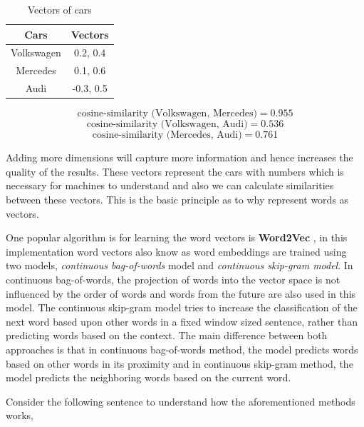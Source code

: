 \begin{table}[!ht]
\centering
\begin{tabular}{cc}
\hline
\textbf{Cars} & \textbf{Vectors} \\ \hline
Volkswagen    & 0.2, 0.4         \\ \hline
Mercedes      & 0.1, 0.6         \\ \hline
Audi          & -0.3, 0.5        \\ \hline
\end{tabular}
\caption{Vectors of cars}
\captionsetup{justification=centering,margin=2cm}
\label{my-label}
\end{table}

\begin{equation}
        \text{cosine-similarity (Volkswagen, Mercedes)} = 0.955 
\end{equation}
\begin{equation}
    \text{cosine-similarity (Volkswagen, Audi)} = 0.536
\end{equation}
\begin{equation}
    \text{cosine-similarity (Mercedes, Audi)} = 0.761
\end{equation}

Adding more dimensions will capture more information and hence increases the quality of the results. These vectors represent the cars with numbers which is necessary for machines to understand and also we can calculate similarities between these vectors. This is the basic principle as to why represent words as vectors.

One popular algorithm is for learning the word vectors is \textbf{Word2Vec} \cite{mikolov2013efficient}, in this implementation word vectors also know as word embeddings are trained using two models, \textit{continuous bag-of-words} model and \textit{continuous skip-gram model}. In continuous bag-of-words, the projection of words into the vector space is not influenced by the order of words and words from the future are also used in this model. The continuous skip-gram model tries to increase the classification of the next word based upon other words in a fixed window sized sentence, rather than predicting words based on the context. The main difference between both approaches is that in continuous bag-of-words method, the model predicts words based on other words in its proximity and in continuous skip-gram method, the model predicts the neighboring words based on the current word.

Consider the following sentence to understand how the aforementioned methods works,

